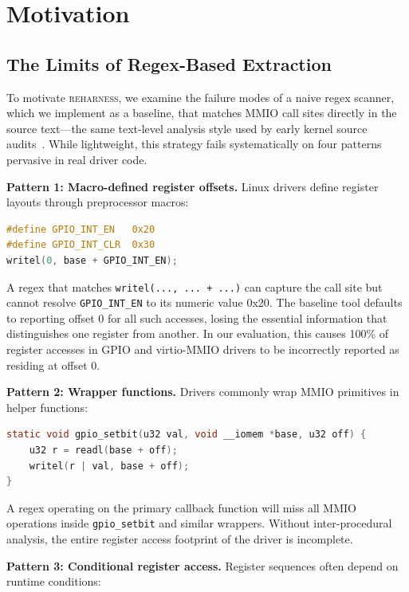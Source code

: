 \documentclass[sigplan, screen, review, anonymous]{acmart}
\newcommand{\reharness}{\textsc{reharness}}
\begin{document}
\section{Motivation}
\label{sec:motivation}

\subsection{The Limits of Regex-Based Extraction}

To motivate \reharness, we examine the failure modes of a naive regex scanner, which we implement as a baseline, that matches MMIO call sites directly in the source text---the same text-level analysis style used by early kernel source audits~\cite{chou2001empirical}. While lightweight, this strategy fails systematically on four patterns pervasive in real driver code.

\textbf{Pattern 1: Macro-defined register offsets.} Linux drivers define register layouts through preprocessor macros:

\begin{lstlisting}[language=C]
#define GPIO_INT_EN   0x20
#define GPIO_INT_CLR  0x30
writel(0, base + GPIO_INT_EN);
\end{lstlisting}

A regex that matches \texttt{writel(..., ... + ...)} can capture the call site but cannot resolve \texttt{GPIO\_INT\_EN} to its numeric value 0x20. The baseline tool defaults to reporting offset 0 for all such accesses, losing the essential information that distinguishes one register from another. In our evaluation, this causes 100\% of register accesses in GPIO and virtio-MMIO drivers to be incorrectly reported as residing at offset 0.

\textbf{Pattern 2: Wrapper functions.} Drivers commonly wrap MMIO primitives in helper functions:

\begin{lstlisting}[language=C]
static void gpio_setbit(u32 val, void __iomem *base, u32 off) {
    u32 r = readl(base + off);
    writel(r | val, base + off);
}
\end{lstlisting}

A regex operating on the primary callback function will miss all MMIO operations inside \texttt{gpio\_setbit} and similar wrappers. Without inter-procedural analysis, the entire register access footprint of the driver is incomplete.

\textbf{Pattern 3: Conditional register access.} Register sequences often depend on runtime conditions:
\end{document}
